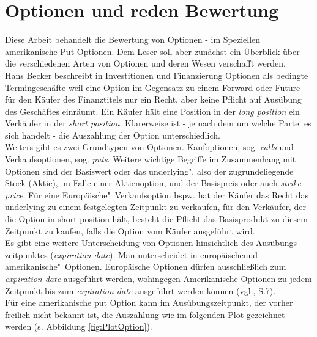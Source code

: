 \documentclass[10pt,a4paper]{report}\usepackage[]{graphicx}\usepackage[]{color}
\begin{document}
\section{Optionen und reden Bewertung}
Diese Arbeit behandelt die Bewertung von Optionen - im Speziellen amerikanische Put Optionen.
Dem Leser soll aber zunächst ein Überblick über die verschiedenen Arten von Optionen und deren Wesen verschafft werden.\\
Hans Becker beschreibt in \glqq Investitionen und Finanzierung \grqq Optionen als \glqq bedingte Termingeschäfte \grqq \cite[S.313]{Becker2012} weil eine Option im Gegensatz zu einem Forward oder Future für den Käufer des Finanztitels nur ein Recht, aber keine Pflicht auf Ausübung des Geschäftes einräumt. Ein Käufer hält eine Position in der \textit{long position}  ein Verkäufer in der \textit{short position}. Klarerweise ist - je nach dem um welche Partei es sich handelt -  die Auszahlung der Option unterschiedlich.\\
Weiters gibt es zwei Grundtypen von Optionen. Kaufoptionen, sog. \textit{calls} und Verkaufsoptionen, sog. \textit{puts}. Weitere wichtige Begriffe im Zusammenhang mit Optionen sind der Basiswert oder das \glqq underlying", also der zugrundeliegende Stock (Aktie), im Falle einer Aktienoption, und der Basispreis oder auch \textit{strike price}. Für eine \glqq Europäische"\ Verkaufsoption bspw. hat der Käufer das Recht das underlying zu 
einem festgelegten Zeitpunkt zu verkaufen, für den Verkäufer, der die Option in short position hält, besteht die Pflicht das Basisprodukt zu diesem Zeitpunkt zu kaufen, falls die Option vom Käufer ausgeführt wird.\\
Es gibt eine weitere Unterscheidung von Optionen hinsichtlich des Ausübungs-zeitpunktes (\textit{expiration date}). Man unterscheidet in \glqq europäische\grqq und \glqq amerikanische"\ Optionen. Europäische Optionen dürfen ausschließlich zum \textit{expiration date} ausgeführt werden, wohingegen Amerikanische Optionen zu jedem Zeitpunkt bis zum \textit{expiration date}  ausgeführt werden können (vgl.\cite{Hull}, S.7).\\
Für eine amerikanische put Option kann im Ausübungszeitpunkt, der vorher freilich nicht bekannt ist, die Auszahlung wie im folgenden Plot gezeichnet werden (s. Abbildung \ref{fig:PlotOption}).
\end{document}
